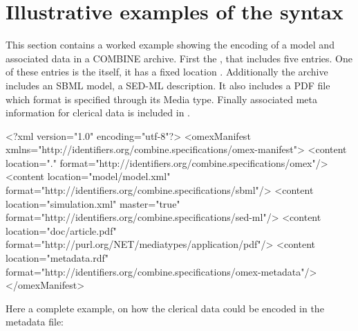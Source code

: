 
\section{Illustrative examples of the syntax}
\label{examples}

This section contains a worked example showing the encoding of a model 
and associated data in a COMBINE archive. First the \OmexManifest, that 
includes five entries. One of these entries is the \OmexManifest itself, 
it has a fixed location . Additionally 
the archive includes an SBML model, a SED-ML description. It also 
includes a PDF file which format is specified through its Media type. Finally 
associated meta information for clerical data is included in 
. 


\begin{example}
<?xml version="1.0" encoding="utf-8"?>
<omexManifest xmlns="http://identifiers.org/combine.specifications/omex-manifest">
    <content location="." 
		         format="http://identifiers.org/combine.specifications/omex"/>
    <content location="model/model.xml" 
		         format="http://identifiers.org/combine.specifications/sbml"/>
    <content location="simulation.xml" master="true"
		         format="http://identifiers.org/combine.specifications/sed-ml"/>
    <content location="doc/article.pdf" 
		         format="http://purl.org/NET/mediatypes/application/pdf"/>
    <content location="metadata.rdf" 
		         format="http://identifiers.org/combine.specifications/omex-metadata"/>
</omexManifest>
\end{example}

Here a complete example, on how the clerical data could be encoded in the metadata file: 

